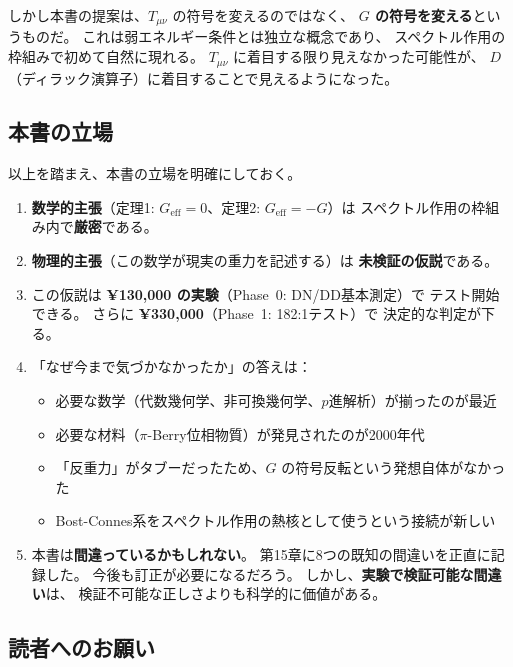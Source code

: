 しかし本書の提案は、$T_{\mu\nu}$ の符号を変えるのではなく、
\textbf{$G$ の符号を変える}というものだ。
これは弱エネルギー条件とは独立な概念であり、
スペクトル作用の枠組みで初めて自然に現れる。
$T_{\mu\nu}$ に着目する限り見えなかった可能性が、
$D$（ディラック演算子）に着目することで見えるようになった。

\subsection*{本書の立場}

以上を踏まえ、本書の立場を明確にしておく。

\begin{tcolorbox}[colback=blue!5,colframe=blue!50!black,title=本書の立場]
\begin{enumerate}
\item \textbf{数学的主張}（定理1: $G_{\mathrm{eff}} = 0$、定理2: $G_{\mathrm{eff}} = -G$）は
  スペクトル作用の枠組み内で\textbf{厳密}である。

\item \textbf{物理的主張}（この数学が現実の重力を記述する）は
  \textbf{未検証の仮説}である。

\item この仮説は \textbf{¥130,000 の実験}（Phase~0: DN/DD基本測定）で
  テスト開始できる。
  さらに \textbf{¥330,000}（Phase~1: 182:1テスト）で
  決定的な判定が下る。

\item 「なぜ今まで気づかなかったか」の答えは：
  \begin{itemize}
  \item 必要な数学（代数幾何学、非可換幾何学、$p$進解析）が揃ったのが最近
  \item 必要な材料（$\pi$-Berry位相物質）が発見されたのが2000年代
  \item 「反重力」がタブーだったため、$G$ の符号反転という発想自体がなかった
  \item Bost-Connes系をスペクトル作用の熱核として使うという接続が新しい
  \end{itemize}

\item 本書は\textbf{間違っているかもしれない}。
  第15章に8つの既知の間違いを正直に記録した。
  今後も訂正が必要になるだろう。
  しかし、\textbf{実験で検証可能な間違い}は、
  検証不可能な正しさよりも科学的に価値がある。
\end{enumerate}
\end{tcolorbox}

\subsection*{読者へのお願い}

